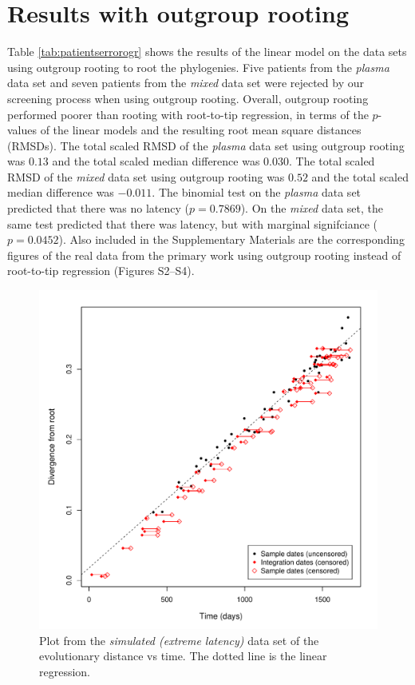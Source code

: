 \documentclass[12pt]{article}
\begin{document}
\section * {Results with outgroup rooting} \label{sec:ogr}
Table \ref{tab:patientserrorogr} shows the results of the linear model on the data sets using outgroup rooting \cite{Huelsenbeck02} to root the phylogenies.
Five patients from the \emph{plasma} data set and seven patients from the \emph{mixed} data set were rejected by our screening process when using outgroup rooting.
Overall, outgroup rooting performed poorer than rooting with root-to-tip regression, in terms of the $p$-values of the linear models and the resulting root mean square distances (RMSDs).
The total scaled RMSD of the \emph{plasma} data set using outgroup rooting was $0.13$ and the total scaled median difference was $0.030$.
The total scaled RMSD of the \emph{mixed} data set using outgroup rooting was $0.52$ and the total scaled median difference was $-0.011$.
The binomial test on the \emph{plasma} data set predicted that there was no latency ($p = 0.7869$).
On the \emph{mixed} data set, the same test predicted that there was latency, but with marginal signifciance ($p = 0.0452$).
Also included in the Supplementary Materials are the corresponding figures of the real data from the primary work using outgroup rooting instead of root-to-tip regression (Figures S2--S4).






\begin{figure}[ht]
	\centering
	\includegraphics[width=12cm]{figures/simulated_extreme.pdf}
	\caption[Simulated Data]{Plot from the \emph{simulated (extreme latency)} data set of the evolutionary distance vs time. The dotted line is the linear regression.}
	\label{fig:resultsextreme}
\end{figure}
\end{document}
